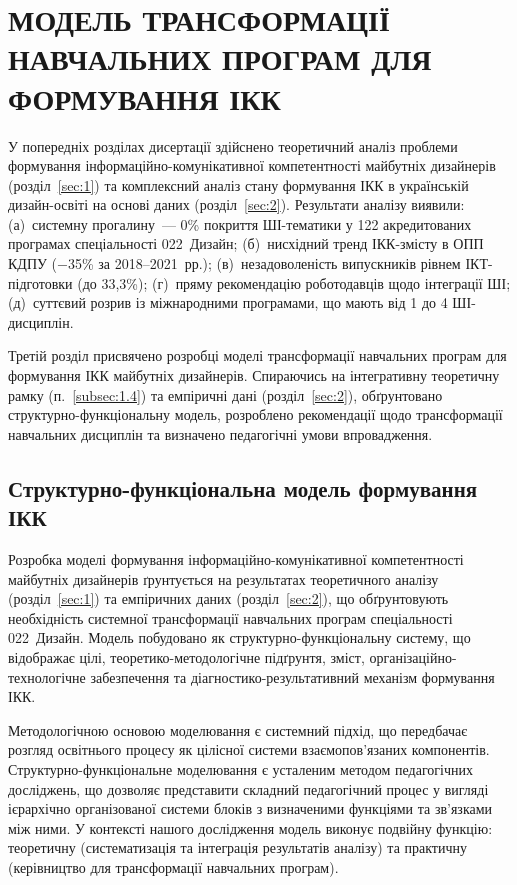 \section{МОДЕЛЬ ТРАНСФОРМАЦІЇ НАВЧАЛЬНИХ ПРОГРАМ ДЛЯ ФОРМУВАННЯ ІКК}\label{sec:3}\label{chap3}

У попередніх розділах дисертації здійснено теоретичний аналіз проблеми формування інформаційно-комунікативної компетентності майбутніх дизайнерів (розділ~\ref{sec:1}) та комплексний аналіз стану формування ІКК в українській дизайн-освіті на основі даних (розділ~\ref{sec:2}). Результати аналізу виявили: (а)~системну прогалину~--- 0\% покриття ШІ-тематики у 122 акредитованих програмах спеціальності 022~Дизайн; (б)~нисхідний тренд ІКК-змісту в ОПП КДПУ ($-$35\% за 2018--2021~рр.); (в)~незадоволеність випускників рівнем ІКТ-підготовки (до 33,3\%); (г)~пряму рекомендацію роботодавців щодо інтеграції ШІ; (д)~суттєвий розрив із міжнародними програмами, що мають від 1 до 4 ШІ-дисциплін.

Третій розділ присвячено розробці моделі трансформації навчальних програм для формування ІКК майбутніх дизайнерів. Спираючись на інтегративну теоретичну рамку (п.~\ref{subsec:1.4}) та емпіричні дані (розділ~\ref{sec:2}), обґрунтовано структурно-функціональну модель, розроблено рекомендації щодо трансформації навчальних дисциплін та визначено педагогічні умови впровадження.

\subsection{Структурно-функціональна модель формування ІКК}\label{subsec:3.1}

Розробка моделі формування інформаційно-комунікативної компетентності майбутніх дизайнерів ґрунтується на результатах теоретичного аналізу (розділ~\ref{sec:1}) та емпіричних даних (розділ~\ref{sec:2}), що обґрунтовують необхідність системної трансформації навчальних програм спеціальності 022~Дизайн. Модель побудовано як структурно-функціональну систему, що відображає цілі, теоретико-методологічне підґрунтя, зміст, організаційно-технологічне забезпечення та діагностико-результативний механізм формування ІКК.

Методологічною основою моделювання є системний підхід, що передбачає розгляд освітнього процесу як цілісної системи взаємопов'язаних компонентів. Структурно-функціональне моделювання є усталеним методом педагогічних досліджень, що дозволяє представити складний педагогічний процес у вигляді ієрархічно організованої системи блоків з визначеними функціями та зв'язками між ними. У контексті нашого дослідження модель виконує подвійну функцію: теоретичну (систематизація та інтеграція результатів аналізу) та практичну (керівництво для трансформації навчальних програм).

